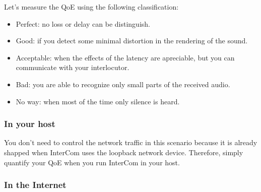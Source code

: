 Let's measure the QoE using the following classification:
\begin{itemize}
\item Perfect: no loss or delay can be distinguish.
\item Good: if you detect some minimal distortion in the rendering
  of the sound.
\item Acceptable: when the effects of the latency are apreciable, but
  you can communicate with your interlocutor.
\item Bad: you are able to recognize only small parts of the
  received audio.
\item No way: when most of the time only silence is heard.
\end{itemize}

\subsubsection{In your host}

You don't need to control the network traffic in this scenario because
it is already shapped when InterCom uses the loopback network
device. Therefore, simply quantify your QoE when you run InterCom in
your host.

\subsubsection{In the Internet}

